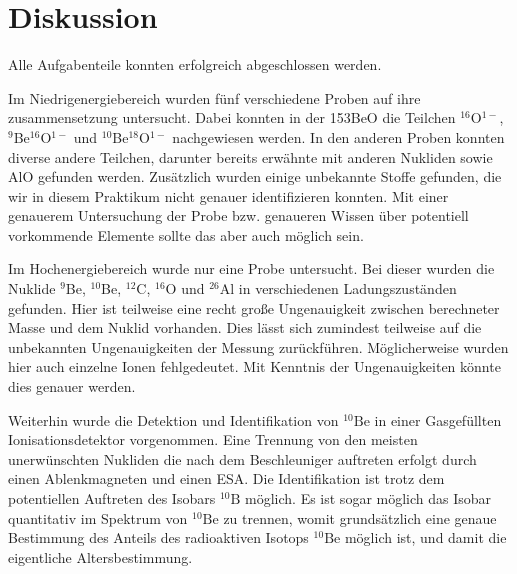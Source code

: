 \section{Diskussion}

Alle Aufgabenteile konnten erfolgreich abgeschlossen werden.

Im Niedrigenergiebereich wurden fünf verschiedene Proben auf ihre zusammensetzung untersucht.
Dabei konnten in der 153BeO die Teilchen $^{16}$O$^{1-}$, $^{9}$Be$^{16}$O$^{1-}$ und $^{10}$Be$^{18}$O$^{1-}$ nachgewiesen werden.
In den anderen Proben konnten diverse andere Teilchen, darunter bereits erwähnte mit anderen Nukliden sowie AlO gefunden werden.
Zusätzlich wurden einige unbekannte Stoffe gefunden, die wir in diesem Praktikum nicht genauer identifizieren konnten.
Mit einer genauerem Untersuchung der Probe bzw. genaueren Wissen über potentiell vorkommende Elemente sollte das aber auch möglich sein.

Im Hochenergiebereich wurde nur eine Probe untersucht.
Bei dieser wurden die Nuklide $^{9}$Be, $^{10}$Be, $^{12}$C, $^{16}$O und $^{26}$Al in verschiedenen Ladungszuständen gefunden.
Hier ist teilweise eine recht große Ungenauigkeit zwischen berechneter Masse und dem Nuklid vorhanden.
Dies lässt sich zumindest teilweise auf die unbekannten Ungenauigkeiten der Messung zurückführen.
Möglicherweise wurden hier auch einzelne Ionen fehlgedeutet.
Mit Kenntnis der Ungenauigkeiten könnte dies genauer werden.

Weiterhin wurde die Detektion und Identifikation von $^{10}\text{Be}$ in einer Gasgefüllten Ionisationsdetektor vorgenommen.
Eine Trennung von den meisten unerwünschten Nukliden die nach dem Beschleuniger auftreten erfolgt durch einen Ablenkmagneten und einen ESA.
Die Identifikation ist trotz dem potentiellen Auftreten des Isobars $^{10}\text{B}$ möglich.
Es ist sogar möglich das Isobar quantitativ im Spektrum von $^{10}\text{Be}$ zu trennen, womit grundsätzlich eine genaue Bestimmung des Anteils des radioaktiven Isotops $^{10}\text{Be}$ möglich ist, und damit die eigentliche Altersbestimmung.

